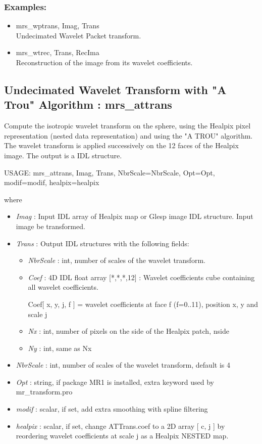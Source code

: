 \subsubsection*{Examples:} 
\begin{itemize}
\item mrs\_wptrans, Imag, Trans \\
Undecimated Wavelet Packet transform.
\item  mrs\_wtrec, Trans, RecIma \\
Reconstruction of the image from its wavelet coefficients.
\end{itemize}



\subsection{Undecimated Wavelet Transform with "A Trou" Algorithm : mrs\_attrans}
Compute the isotropic wavelet transform on the sphere, using the Healpix pixel representation (nested data representation) 
and using the "A TROU" algorithm. The wavelet transform is applied successively on the  12 faces of the Healpix image. 
The output is a IDL structure.
{\bf
\begin{center}
     USAGE: mrs\_attrans, Imag, Trans, NbrScale=NbrScale, Opt=Opt, modif=modif, healpix=healpix
\end{center}}
where
\begin{itemize}
\item {\em Imag} : Input IDL array of Healpix map or Glesp image IDL structure. Input image be transformed. 
\item {\em Trans} : Output IDL structures with the following fields:  
\begin{itemize}
\item {\em NbrScale} : int, number of scales of the wavelet transform.
\item {\em Coef} : 4D IDL float array [*,*,*,12] : Wavelet coefficients cube containing all wavelet coefficients.
\begin{center}
Coef[ x, y, j, f ] = wavelet coefficients at face f (f=0..11), position x, y and scale j
\end{center}
\item {\em Nx} : int, number of pixels on the side of the Healpix patch, nside
\item {\em Ny} : int, same as Nx	
\end{itemize}
\item {\em NbrScale} : int, number of scales of the wavelet transform, default is 4
\item {\em Opt} : string, if package MR1 is installed, extra keyword used by mr\_transform.pro
\item {\em modif} : scalar, if set, add extra smoothing with spline filtering
\item {\em healpix} : scalar, if set, change ATTrans.coef to a 2D array [ c, j ] by reordering wavelet coefficients at scale j as a Healpix NESTED map.
\end{itemize}


